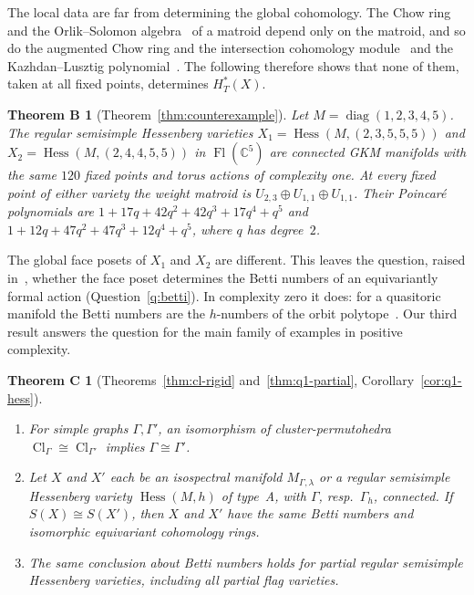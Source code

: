 \documentclass[11pt,a4paper]{article}
\numberwithin{equation}{section}
\theoremstyle{plain}
\newtheorem*{theoremB}{Theorem B}
\newtheorem*{theoremC}{Theorem C}
\theoremstyle{definition}
\theoremstyle{remark}
\newcommand{\C}{\mathbb{C}}
\newcommand{\HT}{H^{*}_{T}}
\DeclareMathOperator{\Fl}{Fl}
\DeclareMathOperator{\Hess}{Hess}
\DeclareMathOperator{\Cl}{Cl}
\DeclareMathOperator{\diag}{diag}
\begin{document}
The local data are far from determining the global cohomology. The Chow ring~\cite{AHK18} and the Orlik--Solomon algebra~\cite{OT92} of a matroid depend only on the matroid, and so do the augmented Chow ring and the intersection cohomology module~\cite{BHMPW22,BHMPW26} and the Kazhdan--Lusztig polynomial~\cite{EPW16}. The following therefore shows that none of them, taken at all fixed points, determines $\HT(X)$.

\begin{theoremB}[Theorem~\ref{thm:counterexample}]
Let $M=\diag(1,2,3,4,5)$. The regular semisimple Hessenberg varieties $X_1=\Hess(M,(2,3,5,5,5))$ and $X_2=\Hess(M,(2,4,4,5,5))$ in $\Fl(\C^5)$ are connected GKM manifolds with the same $120$ fixed points and torus actions of complexity one. At every fixed point of either variety the weight matroid is $U_{2,3}\oplus U_{1,1}\oplus U_{1,1}$. Their Poincaré polynomials are $1+17q+42q^2+42q^3+17q^4+q^5$ and $1+12q+47q^2+47q^3+12q^4+q^5$, where $q$ has degree~$2$.
\end{theoremB}

The global face posets of $X_1$ and $X_2$ are different. This leaves the question, raised in~\cite{Mik22}, whether the face poset determines the Betti numbers of an equivariantly formal action (Question~\ref{q:betti}). In complexity zero it does: for a quasitoric manifold the Betti numbers are the $h$-numbers of the orbit polytope~\cite{BP15}. Our third result answers the question for the main family of examples in positive complexity.

\begin{theoremC}[Theorems~\ref{thm:cl-rigid} and~\ref{thm:q1-partial}, Corollary~\ref{cor:q1-hess}]
\begin{enumerate}[nosep,label=(\arabic*)]
\item For simple graphs $\Gamma,\Gamma'$, an isomorphism of cluster-permutohedra $\Cl_\Gamma\cong\Cl_{\Gamma'}$ implies $\Gamma\cong\Gamma'$.
\item Let $X$ and $X'$ each be an isospectral manifold $M_{\Gamma,\lambda}$ or a regular semisimple Hessenberg variety $\Hess(M,h)$ of type~A, with $\Gamma$, resp.\ $\Gamma_h$, connected. If $S(X)\cong S(X')$, then $X$ and $X'$ have the same Betti numbers and isomorphic equivariant cohomology rings.
\item The same conclusion about Betti numbers holds for partial regular semisimple Hessenberg varieties, including all partial flag varieties.
\end{enumerate}
\end{theoremC}
\end{document}
